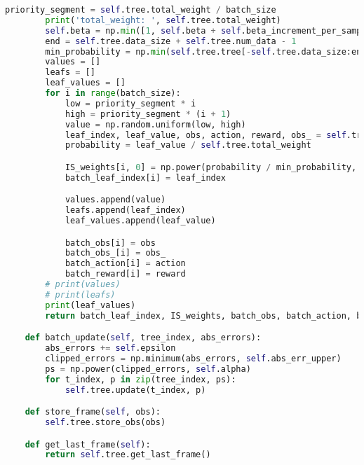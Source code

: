 \begin{lstlisting}[language={python}]
        priority_segment = self.tree.total_weight / batch_size
        print('total_weight: ', self.tree.total_weight)
        self.beta = np.min([1, self.beta + self.beta_increment_per_sampling])
        end = self.tree.data_size + self.tree.num_data - 1
        min_probability = np.min(self.tree.tree[-self.tree.data_size:end]) / self.tree.total_weight
        values = []
        leafs = []
        leaf_values = []
        for i in range(batch_size):
            low = priority_segment * i
            high = priority_segment * (i + 1)
            value = np.random.uniform(low, high)
            leaf_index, leaf_value, obs, action, reward, obs_ = self.tree.get_leaf(value)
            probability = leaf_value / self.tree.total_weight

            IS_weights[i, 0] = np.power(probability / min_probability, -self.beta)
            batch_leaf_index[i] = leaf_index

            values.append(value)
            leafs.append(leaf_index)
            leaf_values.append(leaf_value)

            batch_obs[i] = obs
            batch_obs_[i] = obs_
            batch_action[i] = action
            batch_reward[i] = reward
        # print(values)
        # print(leafs)
        print(leaf_values)
        return batch_leaf_index, IS_weights, batch_obs, batch_action, batch_reward, batch_obs_

    def batch_update(self, tree_index, abs_errors):
        abs_errors += self.epsilon
        clipped_errors = np.minimum(abs_errors, self.abs_err_upper)
        ps = np.power(clipped_errors, self.alpha)
        for t_index, p in zip(tree_index, ps):
            self.tree.update(t_index, p)

    def store_frame(self, obs):
        self.tree.store_obs(obs)

    def get_last_frame(self):
        return self.tree.get_last_frame()
    
\end{lstlisting}